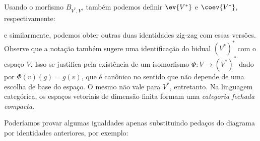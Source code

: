 \documentclass[11pt]{article}
\begin{document}
Usando o morfismo \(B_{V^*,V}\), também podemos definir \(\ev{V^*}\) e \(\coev{V^*}\), respectivamente:


e similarmente, podemos obter outras duas identidades zig-zag com essas versões. Observe que a notação também sugere uma identificação do bidual \((V^*)^*\) com o espaço \(V\). Isso se justifica pela existência de um isomorfismo \(\Phi:V\to (V^*)^*\) dado por \(\Phi(v)(g)=g(v)\), que é canônico no sentido que não depende de uma escolha de base do espaço. O mesmo não vale para \(V^*\), entretanto. Na linguagem categórica, os espaços vetoriais de dimensão finita formam uma \textit{categoria fechada compacta}.

Poderíamos provar algumas igualdades apenas substituindo pedaços do diagrama por identidades anteriores, por exemplo:
\end{document}

